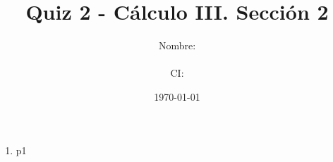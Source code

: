 \documentclass[12pt]{article}
\title{Quiz 2 - Cálculo III. Sección 2}
\author{Nombre: \rule{7cm}{0.4pt}  CI: \rule{5cm}{0.4pt}}
\date{\today}
\begin{document}
\maketitle

\begin{enumerate}
    \item p1
\end{enumerate}
\end{document}
